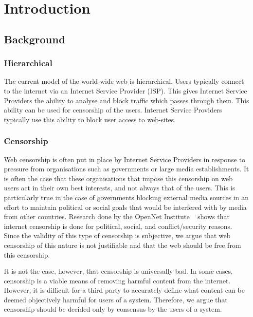 \chapter{Introduction}

\section{Background}

\subsection{Hierarchical}

The current model of the world-wide web is hierarchical. Users typically
connect to the internet via an Internet Service Provider (ISP).
This gives Internet Service Providers the ability to analyse and block
traffic which passes through them. This ability can be used for censorship
of the users. Internet Service Providers typically use this ability to block
user access to web-sites.

\subsection{Censorship}

Web censorship is often put in place by Internet Service Providers in response
to pressure from organisations such as governments or large media establishments.
It is often the case that these organisations that impose this censorship on web
users act in their own best interests, and not always that of the users. This is
particularly true in the case of governments blocking external media sources in
an effort to maintain political or social goals that would be interfered with
by media from other countries. Research done by the OpenNet Institute ~\cite{opennet}
shows that internet censorship is done for political, social, and conflict/security
reasons. Since the validity of this type of censorship is subjective, we argue that
web censorship of this nature is not justifiable and that the web should be free
from this censorship.

It is not the case, however, that censorship is universally bad. In some cases,
censorship is a viable means of removing harmful content from the internet.
However, it is difficult for a third party to accurately define what content
can be deemed objectively harmful for users of a system. Therefore, we argue
that censorship should be decided only by consensus by the users of a system.

